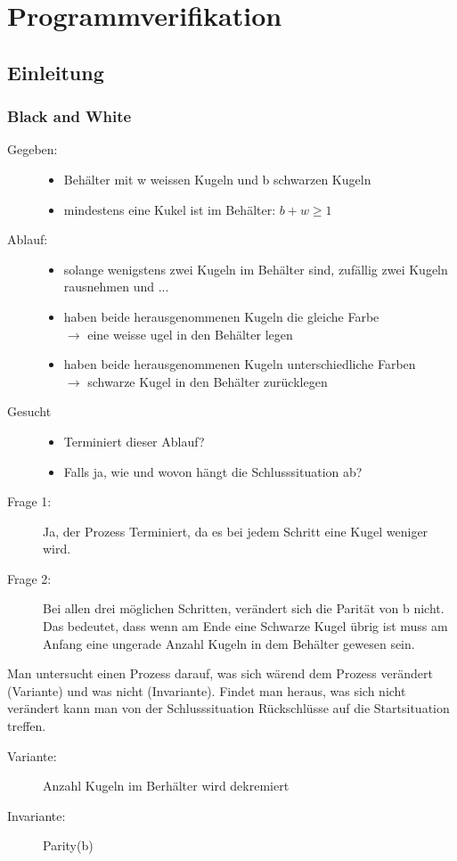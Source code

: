\documentclass[a4paper,10pt]{article}
\begin{document}
\newpage
\section{Programmverifikation}
\subsection{Einleitung}
\subsubsection{Black and White}
\begin{description}
	\item[Gegeben:] \hfill
		\begin{itemize}
			\item Beh\"alter mit w weissen Kugeln und b schwarzen Kugeln
			\item mindestens eine Kukel ist im Beh\"alter: $b + w \geq 1$
		\end{itemize}
	\item[Ablauf:] \hfill
		\begin{itemize}
			\item solange wenigstens zwei Kugeln im Beh\"alter sind, zuf\"allig zwei Kugeln rausnehmen und ...
			\item haben beide herausgenommenen Kugeln die gleiche Farbe \\
				$\rightarrow$ eine weisse ugel in den Beh\"alter legen
			\item haben beide herausgenommenen Kugeln unterschiedliche Farben \\
				$\rightarrow$ schwarze Kugel in den Beh\"alter zur\"ucklegen
		\end{itemize}
	\item[Gesucht] \hfill
		\begin{itemize}
			\item Terminiert dieser Ablauf?
			\item Falls ja, wie und wovon h\"angt die Schlusssituation ab?
		\end{itemize}
\end{description}

\begin{description}
	\item[Frage 1:] Ja, der Prozess Terminiert, da es bei jedem Schritt eine Kugel weniger wird.
	\item[Frage 2:] Bei allen drei m\"oglichen Schritten, ver\"andert sich die Parit\"at von b nicht. Das bedeutet, dass wenn am Ende eine Schwarze Kugel \"ubrig ist muss am Anfang eine ungerade Anzahl Kugeln in dem Beh\"alter gewesen sein.
\end{description}
Man untersucht einen Prozess darauf, was sich w\"arend dem Prozess ver\"andert (Variante) und was nicht (Invariante). Findet man heraus, was sich nicht ver\"andert kann man von der Schlusssituation R\"uckschl\"usse auf die Startsituation treffen.
\begin{description}
	\item[Variante:] Anzahl Kugeln im Berh\"alter wird dekremiert
	\item[Invariante:] Parity(b)
\end{description}
\end{document}
